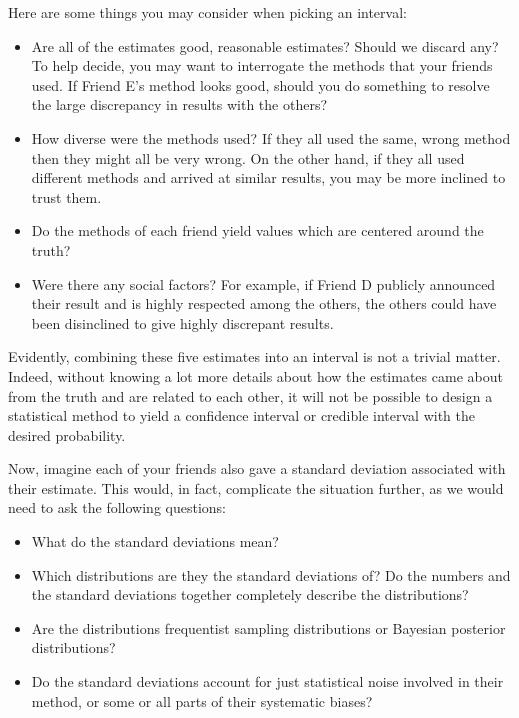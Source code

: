 \documentclass[letterpaper,12pt]{article}
\begin{document}
Here are some things you may consider when picking an interval:

\begin{itemize}

\item
  Are all of the estimates good, reasonable estimates? Should we discard any? To help decide, you may want to interrogate the methods that your friends used. If Friend E's method looks good, should you do something to resolve the large discrepancy in results with the others?
\item
  How diverse were the methods used? If they all used the same, wrong method then they might all be very wrong. On the other hand, if they all used different methods and arrived at similar results, you may be more inclined to trust them.
\item
  Do the methods of each friend yield values which are centered around the truth?
\item
  Were there any social factors? For example, if Friend D publicly announced their result and is highly respected among the others, the others could have been disinclined to give highly discrepant results.
\end{itemize}

Evidently, combining these five estimates into an interval is not a trivial matter. Indeed, without knowing a lot more details about how the estimates came about from the truth and are related to each other, it will not be possible to design a statistical method to yield a confidence interval or credible interval with the desired probability.

Now, imagine each of your friends also gave a standard deviation associated with their estimate. This would, in fact, complicate the situation further, as we would need to ask the following questions:

\begin{itemize}

\item
  What do the standard deviations mean?
\item
  Which distributions are they the standard deviations of? Do the numbers and the standard deviations together completely describe the distributions?
\item
  Are the distributions frequentist sampling distributions or Bayesian posterior distributions?
\item
  Do the standard deviations account for just statistical noise involved in their method, or some or all parts of their systematic biases?
\end{itemize}
\end{document}
